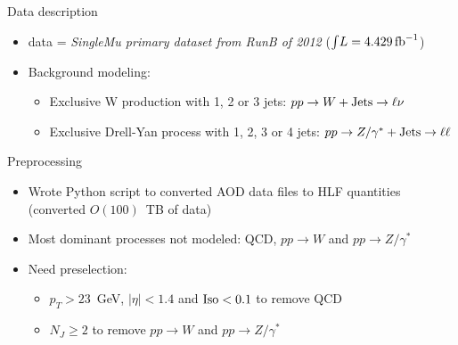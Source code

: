 \documentclass{beamer}
\begin{document}
\begin{frame}{Data description}
  \begin{itemize}
      \item<1-> data = \textit{SingleMu primary dataset from RunB of 2012} ($\int\!L = 4.429\,\textup{fb}^{-1}$)
      \item<2-> Background modeling:
      \begin{itemize}
          \item<3-> Exclusive W production with 1, 2 or 3 jets: $pp \rightarrow W+\textup{Jets} \rightarrow \ell\nu$
          \item<4-> Exclusive Drell-Yan process with 1, 2, 3 or 4 jets: $pp \rightarrow Z/\gamma^* + \textup{Jets} \rightarrow \ell\ell$
      \end{itemize}
  \end{itemize}
  
\end{frame}

\begin{frame}{Preprocessing}
  \begin{itemize}
      \item<1-> Wrote Python script to converted AOD data files to HLF quantities (converted $O(100)$~TB of data)
      \item<2-> Most dominant processes not modeled: QCD, $pp \rightarrow W$ and $pp \rightarrow Z/\gamma^*$
      \item<3-> Need preselection: 
      \begin{itemize}
          \item<4-> $p_T>23$~GeV, $\left | \eta \right | < 1.4$ and $\text{Iso}<\textup{0.1}$ to remove QCD
          \item<5-> $N_J\geq 2$ to remove $pp \rightarrow W$ and $pp \rightarrow Z/\gamma^*$
      \end{itemize}
  \end{itemize}
\end{frame}
\end{document}
